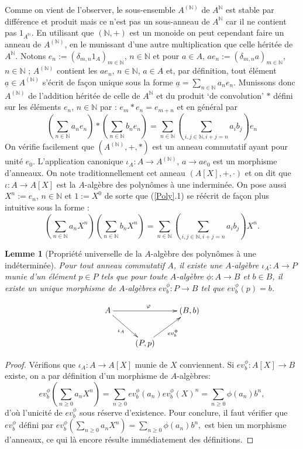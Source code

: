 \documentclass[a4paper, oneside, 12pt]{book}
\theoremstyle{theoremeStyle} %
\newtheorem{lemme}[theoreme]{Lemme}
\theoremstyle{definition} %
\newcommand{\N}{\mathbb{N}}
\begin{document}
Comme on vient de l'observer, le sous-ensemble $A^{(\N)}$ de $ A^\N$ est stable par différence et produit mais ce n'est pas un sous-anneau de $A^\N$ car il ne contient pas $1_{A^\N}$. En utilisant que $(\N,+)$ est un monoide on peut cependant    faire un anneau de $A^{(\N)}$, en le munissant d'une autre multiplication que celle héritée de $A^{\N}$. Notons  $e_n:=(\delta_{m,n}1_{A})_{m\in \N}$, $n\in \N$ et pour $a\in A$, $ae_n:=(\delta_{m,n}a)_{m\in \N}$, $n\in \N$ ; $A^{(\N)}$ contient les $ae_n$, $n\in \N$, $a\in A$ et, par définition,  tout élément $\underline{a}\in A^{(\N)}$ s'écrit de façon unique sous la forme $\underline{a}=\sum_{n\in \N}a_ne_n$. Munissons donc $A^{(\N)}$ de l'addition héritée de celle de $A^\N$ et du produit `de convolution' $*$ défini sur les éléments $e_n$, $n\in \N$ par :
$e_m*e_n=e_{m+n} $ et en général par
\begin{equation}(\sum_{n\in\N}a_ne_n) *(\sum_{n\in \N}b_ne_n)=\sum_{n\in \N}(\sum_{i,j\in \N, i+j=n}a_ib_j)e_n\end{equation} %
On vérifie facilement que $(A^{(\N)},+,*)$ est un anneau commutatif ayant pour unité $e_0$. L'application canonique $\iota_A:A\rightarrow A^{(\N)}$, $a\rightarrow ae_0  $  est un morphisme d'anneaux.
 On note traditionnellement cet anneau $(A[X],+,\cdot)$ et on dit que $\iota:A\rightarrow A[X]$ est la $A$-algèbre des polynômes à une inderminée. On pose aussi $X^n:=e_n$, $n\in \N$ et $1:=X^0$ de sorte que (\ref{Poly}.1) se réécrit de façon plus intuitive sous la forme :
 \begin{equation}(\sum_{n\in\N}a_nX^n)(\sum_{n\in \N}b_nX^n)=\sum_{n\in \N}(\sum_{i,j\in \N, i+j=n}a_ib_j)X^n.\end{equation} 

 \begin{lemme}[Propriété universelle de la $A$-algèbre des polynômes à une indéterminée]Pour tout anneau commutatif $A$, il existe une $A$-algèbre $\iota_A: A\rightarrow P$ munie d'un élément $p\in P$ tels que pour toute $A$-algèbre $\phi: A\rightarrow B$ et  $b\in B$, il existe un unique  morphisme de $A$-algèbres $ev^\phi_b:P\rightarrow B$  tel que $ ev^\phi_b(p)=b$.\end{lemme}

	$$ \xymatrix{A \ar[rd]_{\iota_A} \ar[rr]^\varphi && (B, b) \\ & (P, p) \ar[ru]_{ev_b^\Phi}} $$

\begin{proof} Vérifions que $\iota_A:A\rightarrow A[X]$ munie de $X$ conviennent. Si $ev_b^\phi:A[X]\rightarrow B$ existe,  on a par définition d'un morphisme de $A$-algèbres:
$$ev^\phi_b(\sum_{n\geq 0}a_nX^n)=\sum_{n\geq 0}ev_b^\phi(a_n)ev_b^\phi(X)^n=\sum_{n\geq 0}\phi(a_n)b^n,$$
d'où l'unicité de $ev_b^\phi$ sous réserve d'existence.  Pour conclure, il faut vérifier que $ev_b^\phi$ défini par  $ev^\phi_b(\sum_{n\geq 0}a_nX^n)= \sum_{n\geq 0}\phi(a_n)b^n,$ est bien un morphisme d'anneaux, ce qui là encore résulte immédiatement des définitions.
\end{proof}
\end{document}
